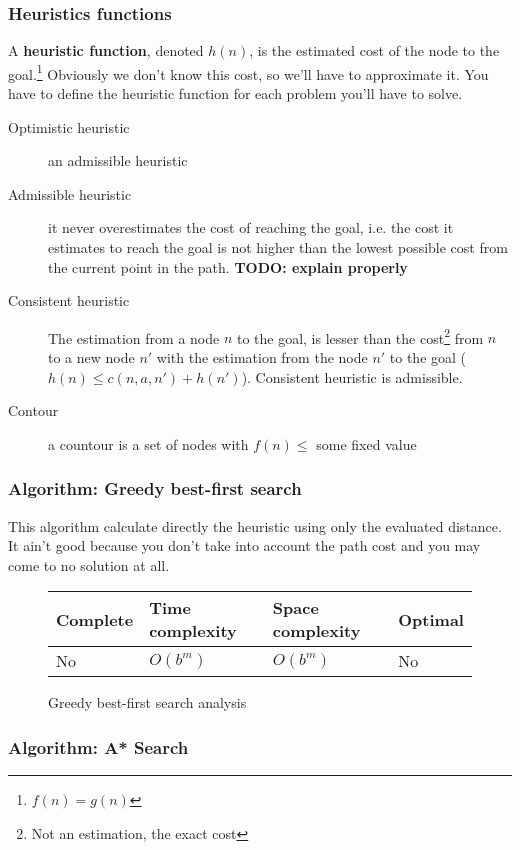 \subsubsection{Heuristics functions}

A \textbf{heuristic function}, denoted $h(n)$, is the estimated cost of the node to the goal.\footnote{$f(n)=g(n)$} Obviously we don't know this cost, so we'll have to approximate it. You have to define the heuristic function for each problem you'll have to solve. 

\begin{description}
\item[Optimistic heuristic] an admissible heuristic
\item[Admissible heuristic] it never overestimates the cost of reaching the goal, i.e. the cost it estimates to reach the goal is not higher than the lowest possible cost from the current point in the path.\cite{wikiadmheur} \textbf{TODO: explain properly}
\item[Consistent heuristic] The estimation from a node $n$ to the goal, is lesser than the cost\footnote{Not an estimation, the exact cost} from $n$ to a new node $n'$ with the estimation from the node $n'$ to the goal ($h(n) \leq c(n,a,n')+h(n')$).
    Consistent heuristic is admissible.
\item[Contour] a countour is a set of nodes with $f(n) \leq$ some fixed value
\end{description}

\subsubsection{Algorithm: Greedy best-first search}

This algorithm calculate directly the heuristic using only the evaluated distance. It ain't good because you don't take into account the path cost and you may come to no solution at all. 

\begin{figure}[h]
\centering
\begin{tabular}{|llll|}
\hline
\textbf{Complete} & \textbf{Time complexity} & \textbf{Space complexity} & \textbf{Optimal} \\
\hline
No& $O(b^m)$ & $O(b^m)$ & No\\
\hline
\end{tabular}
\caption{Greedy best-first search analysis}
\end{figure}

\subsubsection{Algorithm: A* Search}

